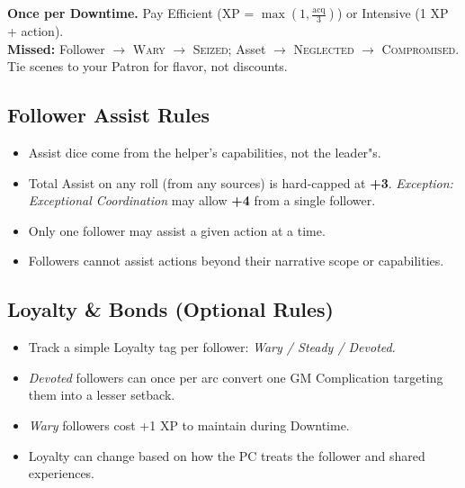 \begin{tcolorbox}[title={Upkeep Quick Reference},colback=gray!5,colframe=black,breakable]
\textbf{Once per Downtime.} Pay Efficient (XP = \(\max(1, \frac{\text{acq}}{3})\)) or Intensive (1 XP + action). \\
\textbf{Missed:} Follower \(\to\) \textsc{Wary} \(\to\) \textsc{Seized}; Asset \(\to\) \textsc{Neglected} \(\to\) \textsc{Compromised}. \\
Tie scenes to your Patron for flavor, not discounts.
\end{tcolorbox}

\subsection{Follower Assist Rules}\label{subsec:follower_assist}

\begin{itemize}
    \item Assist dice come from the helper's capabilities, not the leader"s.
    \item Total Assist on any roll (from any sources) is hard‑capped at \textbf{+3}. \emph{Exception:} \textit{Exceptional Coordination} may allow \textbf{+4} from a single follower.
    \item Only one follower may assist a given action at a time.
    \item Followers cannot assist actions beyond their narrative scope or capabilities.
\end{itemize}

\subsection{Loyalty \& Bonds (Optional Rules)}\label{subsec:follower_loyalty}

\begin{itemize}
    \item Track a simple Loyalty tag per follower: \emph{Wary / Steady / Devoted}.
    \item \emph{Devoted} followers can once per arc convert one GM Complication targeting them into a lesser setback.
    \item \emph{Wary} followers cost +1 XP to maintain during Downtime.
    \item Loyalty can change based on how the PC treats the follower and shared experiences.
\end{itemize}

